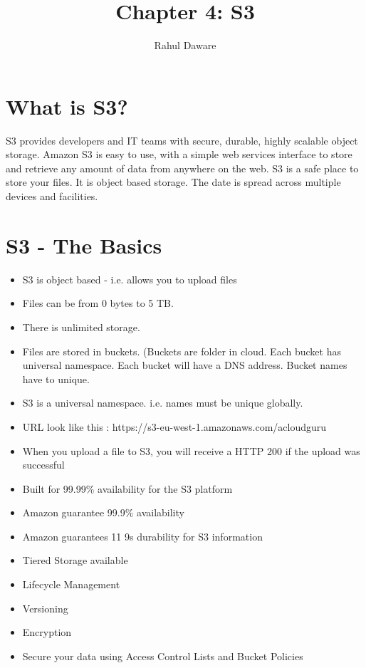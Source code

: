 \documentclass{article}
\author{Rahul Daware}
\begin{document}
\title{Chapter 4: S3}
\maketitle
\tableofcontents
\newpage

\section{What is S3?}
S3 provides developers and IT teams with secure, durable, highly scalable object storage. Amazon S3 is easy to use, with a simple web services interface to store and retrieve any amount of data from anywhere on the web. S3 is a safe place to store your files. It is object based storage. The date is spread across multiple devices and facilities.

\section{S3 - The Basics}
\begin{itemize}
\item
S3 is object based - i.e. allows you to upload files

\item
Files can be from 0 bytes to 5 TB.

\item
There is unlimited storage.

\item
Files are stored in buckets. (Buckets are folder in cloud. Each bucket has universal namespace. Each bucket will have a DNS address. Bucket names have to unique.

\item
S3 is a universal namespace. i.e. names must be unique globally.

\item
URL look like this : https://s3-eu-west-1.amazonaws.com/acloudguru

\item
When you upload a file to S3, you will receive a HTTP 200 if the upload was successful

\item
Built for 99.99\% availability for the S3 platform

\item
Amazon guarantee 99.9\% availability

\item
Amazon guarantees 11 9s durability for S3 information

\item
Tiered Storage available

\item
Lifecycle Management

\item
Versioning

\item
Encryption

\item
Secure your data using Access Control Lists and Bucket Policies

\end{itemize}
\end{document}
